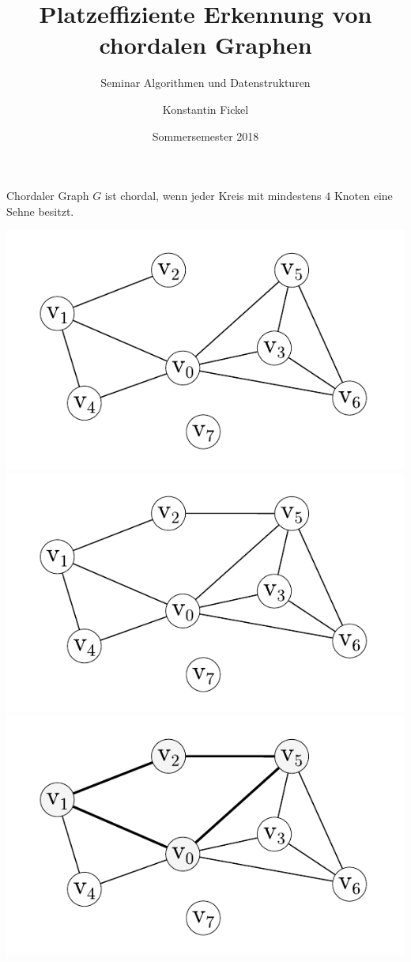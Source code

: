 \documentclass[xcolor=x11names,compress]{beamer}
\title{Platzeffiziente Erkennung von chordalen Graphen}
\subtitle{Seminar \glqq{}Algorithmen und Datenstrukturen\grqq{}}
\author{Konstantin Fickel}
\date{Sommersemester 2018}
\begin{document}
\begin{frame}
	\begin{overprint}
		\begin{block}{Chordaler Graph}
			\( G \) ist chordal, wenn jeder Kreis mit mindestens \( 4 \) Knoten eine Sehne besitzt.
		\end{block}
	\end{overprint}
	\begin{center}
		\begin{overprint}
			\includegraphics[scale=1.0]{img/graph/chordalsimple.pdf}
			\onslide<3>\includegraphics[scale=1.0]{img/graph/chordalnot.pdf}
			\onslide<4>\includegraphics[scale=1.0]{img/graph/chordalnot_highlighted.pdf}

\end{overprint}
\end{center}
\end{frame}
\end{document}
